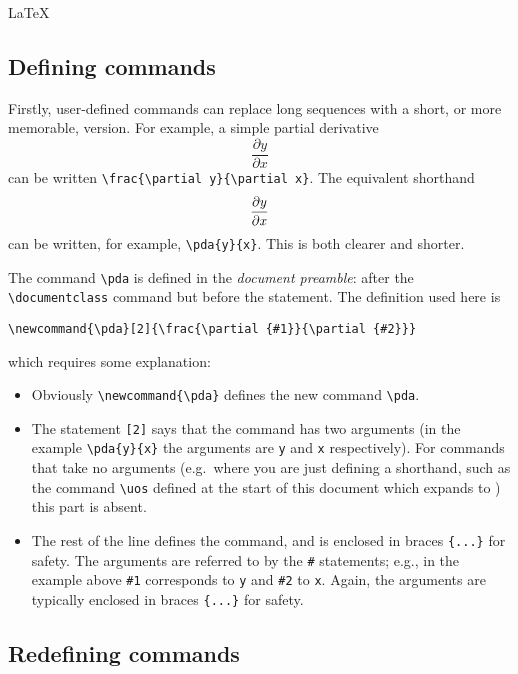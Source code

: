 \begin{chapter}{\LaTeX}
\subsection{Defining commands}
\label{sec:commands_defn}

Firstly, user-defined commands can replace long sequences with a short, or more memorable, version. For example, a simple partial derivative
%
\begin{equation}
  \label{eq:example_pd_1}
  \frac{\partial y}{\partial x}
\end{equation}
%
can be written \verb|\frac{\partial y}{\partial x}|. The equivalent shorthand
%
\begin{equation}
  \label{eq:example_pd_2}
  \pda{y}{x}
\end{equation}
%
can be written, for example, \verb|\pda{y}{x}|. This is both clearer and shorter.

The command \verb|\pda| is defined in the \emph{document preamble}: after the \verb|\documentclass| command but before the \verb|| statement. The definition used here is
%
\begin{center}
  \verb|\newcommand{\pda}[2]{\frac{\partial {#1}}{\partial {#2}}}|
\end{center}
%
which requires some explanation:
\begin{itemize}
\item Obviously \verb|\newcommand{\pda}| defines the new command
  \verb|\pda|.
\item The statement \verb|[2]| says that the command has two arguments
  (in the example \verb|\pda{y}{x}| the arguments are \verb|y| and
  \verb|x| respectively). For commands that take no arguments (e.g.\
  where you are just defining a shorthand, such as the command
  \verb|\uos| defined at the start of this document which expands to
  \uos) this part is absent.
\item The rest of the line defines the command, and is enclosed in
  braces \verb|{...}| for safety. The arguments are referred to by the
  \verb|#| statements; e.g., in the example above \verb|#1|
  corresponds to \verb|y| and \verb|#2| to \verb|x|. Again, the
  arguments are typically enclosed in braces \verb|{...}| for safety.
\end{itemize}

\subsection{Redefining commands}
\label{sec:commands_redefn}


\end{chapter}
